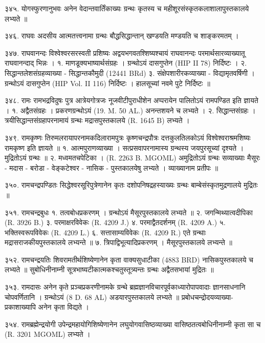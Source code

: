 ३४५. योगस्फुरणानुभवः
अनेन वेदान्तवार्तिंकाख्यः ग्रन्थः कृतस्य च महीशूरसंस्कृतकलाशालापुस्तकालये लभ्यते ॥

३४६. राघवः
अदसीय आत्मतत्त्वनामा ग्रन्थः बौद्धसिद्धान्तान् खण्डयति मण्डयति च शाङ्करमतम् ।

३४७. राघवानन्दः
विश्वेश्वरसरस्वती प्रशिष्यः अद्वयभगवतश्शिष्यश्चायं राघवानन्दः परमार्थसारव्याख्यातू राघवानन्दाद् भिन्नः ।
१. माणडूक्यभाष्यार्थसंग्रहः । ग्रन्थोऽयं दासगुप्तेन (HIP II 78) निर्दिष्टः ।
२. सिद्धान्तलेशसंग्रहव्याख्या - सिद्धान्तकौमुदी (12441 BRd)
३. संक्षेपशारीरकव्याख्या - विद्यामृतवर्षिणी । ग्रन्थोऽयं दासगुप्तेन (HIP Vol. II 116) निर्दिष्टः । हालसूच्यां नवमे पुटे निर्दिष्टः ॥

३४८. रामः
रामभद्रविदुषः पुत्र आत्रेयगोत्रजः नूजवीटीपुराधीशेन अप्परायेन पालितोऽयं रामपण्डित इति ज्ञायते ।
१. अद्वैतसंग्रहः । प्रकरणग्रन्थोऽयं (19. M. 50 AL.) अनन्तशयने च लभ्यते ।
२. सिद्धान्तसंग्रहः । त्रयीसिद्धान्तसंग्रहापरनामायं ग्रन्थः मद्रासपुस्तकालये (R. 1645 B) लभ्यते ।

३४९. रामकृष्णः
तिरुमलरायापरनामकदिलारामपुत्रः कृष्णचन्द्रपौत्रः दत्तकुलतिलकोऽयं विश्वेश्वराश्रमशिष्यः रामकृष्ण इति ज्ञायते ॥
१. आत्मपुराणव्याख्या । सत्प्रसवापरनामास्य ग्रन्थस्य जयपुरसूच्यां दृश्यते । मुद्रितोऽयं ग्रन्थः ॥
२. मध्वमतचपेटिका । (R. 2263 B. MGOML)
अमुद्रितोऽयं ग्रन्थः सव्याख्याः मैसूरः - मदास - बरोडा - वेङ्कटेश्वर - नासिक - पुस्तकालयेषु लभ्यते । व्याख्यानाम प्रतीपः ॥

३५०. रामचन्द्रपण्डितः
सिद्धेश्वरसूरिपुत्रेणानेन कृतः दशोपनिषद्रहस्याख्यः ग्रन्थः बाम्बेसंस्कृतमुद्रणालये मुद्रितः ॥

३५१. रामचन्द्रबुधः
१. तत्वबोधप्रकरणम् । ग्रन्थोऽयं मैसूरपुस्तकालये लभ्यते ॥
२. जगन्मिथ्यात्वदीपिका (R. 3926 B.)
३. परमाक्षरविवेकः (R. 4209 J.)
४. परमाद्वैतदर्शनम् (R. 4209 A.)
५. भक्तिस्वरूपविवेकः (R. 4209 L.)
६. सत्तासाम्यविवेकः (R. 4209 R.) एते ग्रन्थाः मद्रासराजकीयपुस्तकालये लभ्यन्ते ॥
७. त्रिपाद्विभूत्यादिप्रकरणम् । मैसूरपुस्तकालये लभ्यन्ते ॥

३५२. रामचन्द्रयतिः
शिवरामतीर्थशिष्येणानेन कृता वाक्यसुधाटीका (4883 BRD) नासिकपुस्तकालये च लभ्यते ॥ सुबोधिनीनाम्नी सूत्रभाष्यटीकात्मकश्चतुस्तूत्र्यन्तः ग्रन्थः अद्वैतसभायां मुद्रितः ॥

३५३. रामदासः
अनेन कृते प्रञ्चप्रकरणीनामके ग्रन्थे ब्रह्मज्ञानविचारपूर्वकाध्यारोपापवादाः ज्ञानसाधनानि चोपवर्णितानि । ग्रन्थोऽयं (8 D. 68 AL) अडयारपुस्तकालये लभ्यते ॥ प्रबोधचन्द्रोदयव्याख्या-प्रकाशाख्यापि अनेन कृता विद्यते ।

३५४. रामब्रह्मेन्द्रयोगी
उपेन्द्रमहायोगिशिष्येणानेन लघुयोगवासिष्ठव्याख्या वासिष्ठतत्वबोधिनीनाम्नी कृता सा च (R. 3201 MGOML) लभ्यते ।


